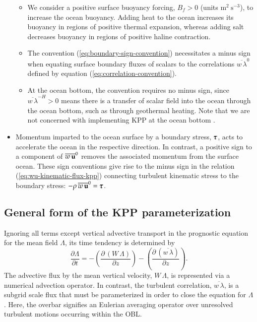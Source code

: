 \begin{itemize}
\begin{itemize}
\item We consider a positive surface buoyancy forcing, $B_{f} > 0$
  (units $\mbox{m}^{2}~\mbox{s}^{-3}$), to increase the ocean
  buoyancy.  Adding heat to the ocean increases its buoyancy in
  regions of positive thermal expansion, whereas adding salt decreases
  buoyancy in regions of positive haline contraction.

\item The convention (\ref{eq:boundary-sign-convention}) necessitates
  a minus sign when equating surface boundary fluxes of scalars to the
  correlations $\overline{w \, \lambda}^{0}$ defined by equation
  (\ref{eq:correlation-convention}).

\item At the ocean bottom, the convention requires no minus sign,
  since $\overline{w \, \lambda}^{-H} > 0$ means there is a transfer
  of scalar field into the ocean through the ocean bottom, such as
  through geothermal heating.  Note that we are not concerned with
  implementing KPP at the ocean bottom \citep{Durski_etal2004}.

\end{itemize}

\item Momentum imparted to the ocean surface by a boundary stress,
  $\mbox{\boldmath $\tau$}$, acts to accelerate the ocean in the respective direction.
  In contrast, a positive sign to a component of $\overline{w \, {\bf
      u}}^{0}$ removes the associated momentum from the surface
  ocean.  These sign conventions give rise to the minus sign in the
  relation (\ref{eq:wu-kinematic-flux-kpp}) connecting turbulent
  kinematic stress to the boundary stress: $-\rho \, \overline{w \,
    {\bf u}}^{0} = \mbox{\boldmath $\tau$}$.  

\end{itemize}

 
\subsection{General form of the KPP parameterization}

Ignoring all terms except vertical advective transport in the
prognostic equation for the mean field $\Lambda$, its time tendency 
is determined by 
\begin{equation}
 \frac{\partial \Lambda}{\partial t} = -\left( \frac{\partial \, (W \, \Lambda)}{\partial z} \right)  
 -\left( \frac{\partial \, (\overline{w \, \lambda}) }{\partial z} \right).  
\label{eq:mean-field-equation-kpp}
\end{equation}
The advective flux by the mean vertical velocity, $W \, \Lambda$, is
represented via a numerical advection operator. In contrast, the
turbulent correlation, $\overline{w \, \lambda}$, is a subgrid scale
flux that must be parameterized in order to close the equation for
$\Lambda$. Here, the overbar signifies an Eulerian averaging operator
over unresolved turbulent motions occurring within the OBL.

